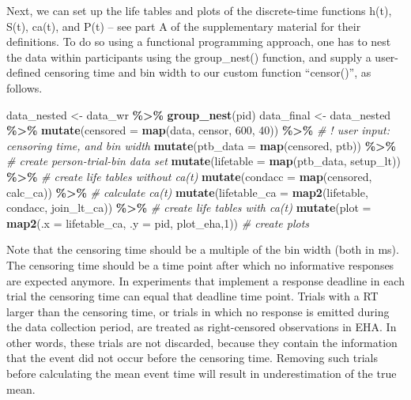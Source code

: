 \documentclass[
  man, donotrepeattitle,floatsintext]{apa6}
\newenvironment{Shaded}{\begin{snugshade}}{\end{snugshade}}
\newcommand{\AttributeTok}[1]{\textcolor[rgb]{0.13,0.29,0.53}{#1}}
\newcommand{\CommentTok}[1]{\textcolor[rgb]{0.56,0.35,0.01}{\textit{#1}}}
\newcommand{\DecValTok}[1]{\textcolor[rgb]{0.00,0.00,0.81}{#1}}
\newcommand{\FunctionTok}[1]{\textcolor[rgb]{0.13,0.29,0.53}{\textbf{#1}}}
\newcommand{\NormalTok}[1]{#1}
\newcommand{\OtherTok}[1]{\textcolor[rgb]{0.56,0.35,0.01}{#1}}
\newcommand{\SpecialCharTok}[1]{\textcolor[rgb]{0.81,0.36,0.00}{\textbf{#1}}}
\begin{document}
\normalsize

Next, we can set up the life tables and plots of the discrete-time functions h(t), S(t), ca(t), and P(t) -- see part A of the supplementary material for their definitions. To do so using a functional programming approach, one has to nest the data within participants using the group\_nest() function, and supply a user-defined censoring time and bin width to our custom function ``censor()'', as follows.

\scriptsize

\begin{Shaded}
\begin{Highlighting}[]
\NormalTok{data\_nested }\OtherTok{\textless{}{-}}\NormalTok{ data\_wr }\SpecialCharTok{\%\textgreater{}\%} \FunctionTok{group\_nest}\NormalTok{(pid)}
\NormalTok{data\_final }\OtherTok{\textless{}{-}}\NormalTok{ data\_nested }\SpecialCharTok{\%\textgreater{}\%} 
  \FunctionTok{mutate}\NormalTok{(}\AttributeTok{censored  =} \FunctionTok{map}\NormalTok{(data, censor, }\DecValTok{600}\NormalTok{, }\DecValTok{40}\NormalTok{)) }\SpecialCharTok{\%\textgreater{}\%}   \CommentTok{\# ! user input: censoring time, and bin width}
  \FunctionTok{mutate}\NormalTok{(}\AttributeTok{ptb\_data  =} \FunctionTok{map}\NormalTok{(censored, ptb)) }\SpecialCharTok{\%\textgreater{}\%}           \CommentTok{\# create person{-}trial{-}bin data set}
  \FunctionTok{mutate}\NormalTok{(}\AttributeTok{lifetable =} \FunctionTok{map}\NormalTok{(ptb\_data, setup\_lt)) }\SpecialCharTok{\%\textgreater{}\%}      \CommentTok{\# create life tables without ca(t)}
  \FunctionTok{mutate}\NormalTok{(}\AttributeTok{condacc   =} \FunctionTok{map}\NormalTok{(censored, calc\_ca)) }\SpecialCharTok{\%\textgreater{}\%}       \CommentTok{\# calculate ca(t)}
  \FunctionTok{mutate}\NormalTok{(}\AttributeTok{lifetable\_ca =} \FunctionTok{map2}\NormalTok{(lifetable, condacc, join\_lt\_ca)) }\SpecialCharTok{\%\textgreater{}\%}    \CommentTok{\# create life tables with ca(t)}
  \FunctionTok{mutate}\NormalTok{(}\AttributeTok{plot      =} \FunctionTok{map2}\NormalTok{(}\AttributeTok{.x =}\NormalTok{ lifetable\_ca, }\AttributeTok{.y =}\NormalTok{ pid, plot\_eha,}\DecValTok{1}\NormalTok{))  }\CommentTok{\# create plots }
\end{Highlighting}
\end{Shaded}

\normalsize

Note that the censoring time should be a multiple of the bin width (both in ms). The censoring time should be a time point after which no informative responses are expected anymore. In experiments that implement a response deadline in each trial the censoring time can equal that deadline time point. Trials with a RT larger than the censoring time, or trials in which no response is emitted during the data collection period, are treated as right-censored observations in EHA. In other words, these trials are not discarded, because they contain the information that the event did not occur before the censoring time. Removing such trials before calculating the mean event time will result in underestimation of the true mean.
\end{document}
